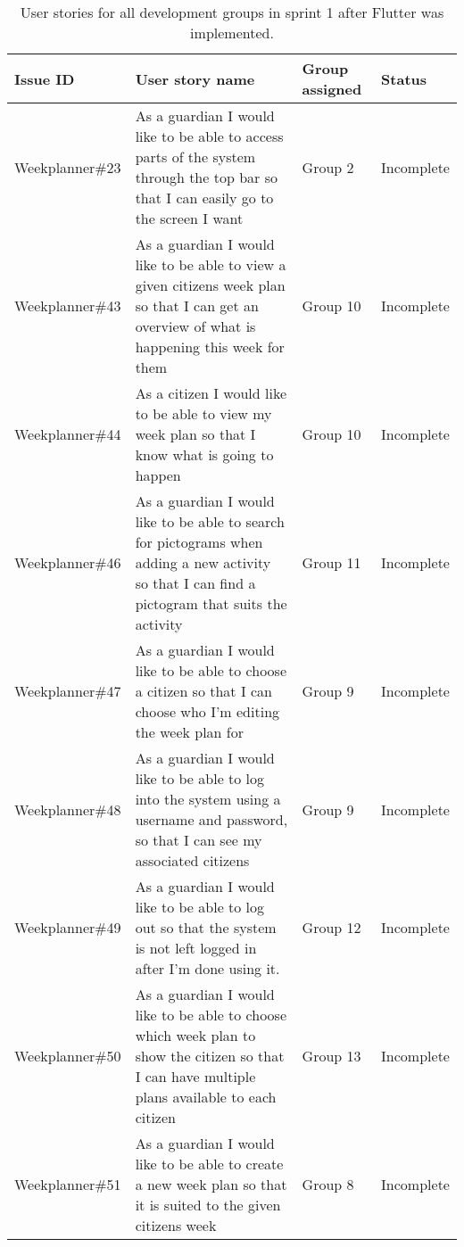 \begin{table}[H]
    \begin{tabular}{|p{2.8cm}|p{7cm}|p{2cm}|p{2cm}|}
    \hline
    Issue ID        & User story name                                                                                                                                                          & Group assigned  & Status     \\ \hline
    Weekplanner\#23 & As a guardian I would like to be able to access parts of the system through the top bar so that I can easily go to the screen I want                                     & Group 2         & Incomplete  \\ \hline
    Weekplanner\#43 & As a guardian I would like to be able to view a given citizens week plan so that I can get an overview of what is happening this week for them                           & Group 10        & Incomplete     \\ \hline
    Weekplanner\#44 & As a citizen I would like to be able to view my week plan so that I know what is going to happen                                                                         & Group 10        & Incomplete       \\ \hline
    Weekplanner\#46 & As a guardian I would like to be able to search for pictograms when adding a new activity so that I can find a pictogram that suits the activity                         & Group 11        & Incomplete      \\ \hline
    Weekplanner\#47 & As a guardian I would like to be able to choose a citizen so that I can choose who I’m editing the week plan for                                                         & Group 9         & Incomplete    \\ \hline
    Weekplanner\#48 & As a guardian I would like to be able to log into the system using a username and password, so that I can see my associated citizens                                     & Group 9         & Incomplete    \\ \hline
    Weekplanner\#49 & As a guardian I would like to be able to log out so that the system is not left logged in after I’m done using it.                                                       & Group 12        & Incomplete      \\ \hline
    Weekplanner\#50 & As a guardian I would like to be able to choose which week plan to show the citizen so that I can have multiple plans available to each citizen                          & Group 13        & Incomplete     \\ \hline
    Weekplanner\#51 & As a guardian I would like to be able to create a new week plan so that it is suited to the given citizens week                                                          & Group 8         & Incomplete    \\ \hline
   \end{tabular}
   \caption{User stories for all development groups in sprint 1 after Flutter was implemented.}\label{table:user-stories-sprint-1-review}
\end{table}


